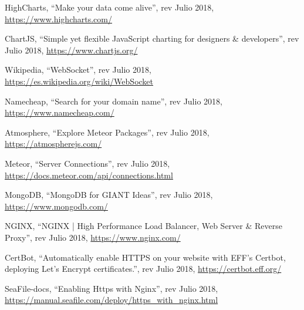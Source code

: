 \begin{thebibliography}{99}
 HighCharts, ``Make your data come alive'', rev Julio 2018, \hyperref[highcharts]{https://www.highcharts.com/}

 ChartJS, ``Simple yet flexible JavaScript charting for designers \& developers'', rev Julio 2018, \hyperref[chartjs]{https://www.chartjs.org/}

 Wikipedia, ``WebSocket'', rev Julio 2018, \hyperref[websocket]{https://es.wikipedia.org/wiki/WebSocket}

 Namecheap, ``Search for your domain name'', rev Julio 2018, \hyperref[namecheap]{https://www.namecheap.com/}

 Atmosphere, ``Explore Meteor Packages'', rev Julio 2018, \hyperref[atmosphere]{https://atmospherejs.com/}

 Meteor, ``Server Connections'', rev Julio 2018, \hyperref[ddp]{https://docs.meteor.com/api/connections.html}

 MongoDB, ``MongoDB for GIANT Ideas'', rev Julio 2018, \hyperref[mongodb]{https://www.mongodb.com/}

 NGINX, ``NGINX | High Performance Load Balancer, Web Server \& Reverse Proxy'', rev Julio 2018, \hyperref[nginx]{https://www.nginx.com/}

 CertBot, ``Automatically enable HTTPS on your website with EFF's Certbot, deploying Let's Encrypt certificates.'', rev Julio 2018, \hyperref[certbot]{https://certbot.eff.org/}

 SeaFile-docs, ``Enabling Https with Nginx'', rev Julio 2018, \hyperref[nginx_certbot]{https://manual.seafile.com/deploy/https\_with\_nginx.html}

%
%
\end{thebibliography}